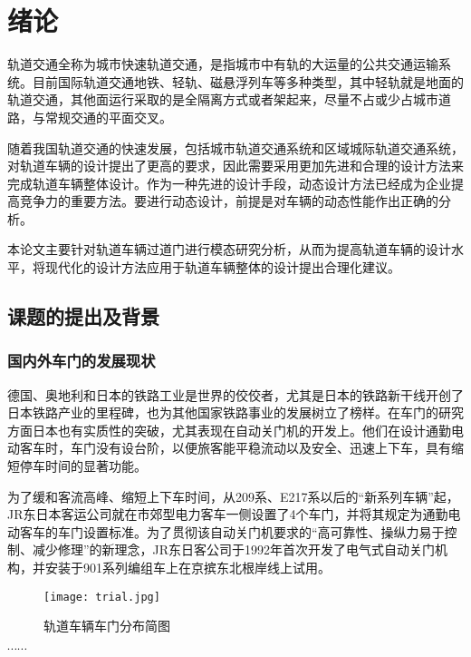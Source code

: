 \section{绪论}
轨道交通全称为城市快速轨道交通，是指城市中有轨的大运量的公共交通运输系统。目前国际轨道交通地铁、轻轨、磁悬浮列车等多种类型，其中轻轨就是地面的轨道交通，其他面运行采取的是全隔离方式或者架起来，尽量不占或少占城市道路，与常规交通的平面交叉。

随着我国轨道交通的快速发展，包括城市轨道交通系统和区域城际轨道交通系统，对轨道车辆的设计提出了更高的要求，因此需要采用更加先进和合理的设计方法来完成轨道车辆整体设计。作为一种先进的设计手段，动态设计方法已经成为企业提高竞争力的重要方法。要进行动态设计，前提是对车辆的动态性能作出正确的分析。

本论文主要针对轨道车辆过道门进行模态研究分析，从而为提高轨道车辆的设计水平，将现代化的设计方法应用于轨道车辆整体的设计提出合理化建议。
\subsection{课题的提出及背景}
\subsubsection{国内外车门的发展现状}
德国、奥地利和日本的铁路工业是世界的佼佼者，尤其是日本的铁路新干线开创了日本铁路产业的里程碑，也为其他国家铁路事业的发展树立了榜样。在车门的研究方面日本也有实质性的突破，尤其表现在自动关门机的开发上。他们在设计通勤电动客车时，车门没有设台阶，以便旅客能平稳流动以及安全、迅速上下车，具有缩短停车时间的显著功能。

为了缓和客流高峰、缩短上下车时间，从209系、E217系以后的“新系列车辆”起，JR东日本客运公司就在市郊型电力客车一侧设置了4个车门，并将其规定为通勤电动客车的车门设置标准。为了贯彻该自动关门机要求的“高可靠性、操纵力易于控制、减少修理”的新理念，JR东日客公司于1992年首次开发了电气式自动关门机构，并安装于901系列编组车上在京摈东北根岸线上试用。

\begin{figure}[hpb]
    \centering
    \texttt{[image: trial.jpg]}
    \caption{轨道车辆车门分布简图}
    \label{fig:trial}
\end{figure}

$\cdots\cdots$